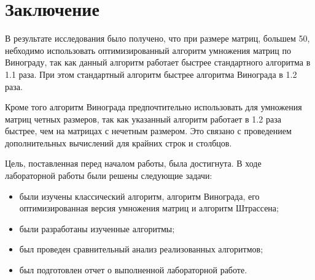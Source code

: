 \chapter*{Заключение}

В результате исследования было получено, что при размере матриц, большем 50, небходимо использовать оптимизированный алгоритм умножения матриц по Винограду, так как данный алгоритм работает быстрее стандартного алгоритма в 1.1 раза. При этом стандартный алгоритм быстрее алгоритма Винограда в 1.2 раза.

Кроме того алгоритм Винограда предпочтительно использовать для умножения матриц четных размеров, так как указанный алгоритм работает в 1.2 раза быстрее, чем на матрицах с нечетным размером. Это связано с проведением дополнительных вычислений для крайних строк и столбцов.

Цель, поставленная перед началом работы, была достигнута. В ходе лабораторной работы были решены следующие задачи:

\begin{itemize}
	\item были изучены классический алгоритм, алгоритм Винограда, его оптимизированная версия умножения матриц и алгоритм Штрассена;
	\item были разработаны изученные алгоритмы;
	\item был проведен сравнительный анализ реализованных алгоритмов;
	\item был подготовлен отчет о выполненной лабораторной работе.
\end{itemize}
